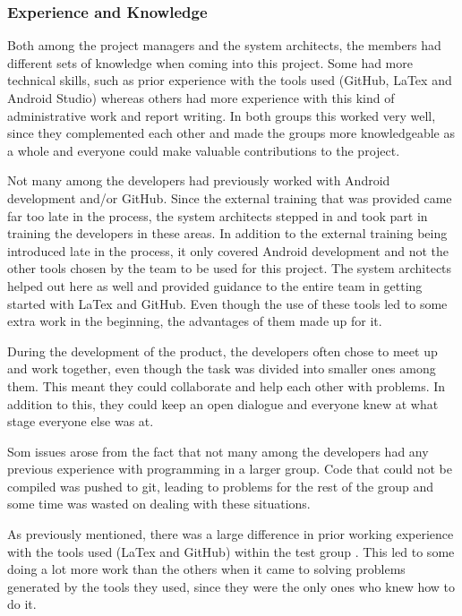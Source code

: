 \documentclass[a4paper]{article}
\begin{document}

\subsubsection{Experience and Knowledge}
Both among the project managers and the system architects, the members had different sets of knowledge when coming into this project. Some had more technical skills, such as prior experience with the tools used (GitHub, LaTex and Android Studio) whereas others had more experience with this kind of administrative work and report writing. In both groups this worked very well, since they complemented each other and made the groups more knowledgeable as a whole and everyone could make valuable contributions to the project.

Not many among the developers had previously worked with Android development and/or GitHub. Since the external training that was provided came far too late in the process, the system architects stepped in and took part in training the developers in these areas. In addition to the external training being introduced late in the process, it only covered Android development and not the other tools chosen by the team to be used for this project. The system architects helped out here as well and provided guidance to the entire team in getting started with LaTex and GitHub. Even though the use of these tools led to some extra work in the beginning, the advantages of them made up for it.

During the development of the product, the developers often chose to meet up and work together, even though the task was divided into smaller ones among them. This meant they could collaborate and help each other with problems. In addition to this, they could keep an open dialogue and everyone knew at what stage everyone else was at.

Som issues arose from the fact that not many among the developers had any previous experience with programming in a larger group. Code that could not be compiled was pushed to git, leading to problems for the rest of the group and some time was wasted on dealing with these situations.

As previously mentioned, there was a large difference in prior working experience with the tools used (LaTex and GitHub) within the test group . This led to some doing a lot more work than the others when it came to solving problems generated by the tools they used, since they were the only ones who knew how to do it.
\end{document}
